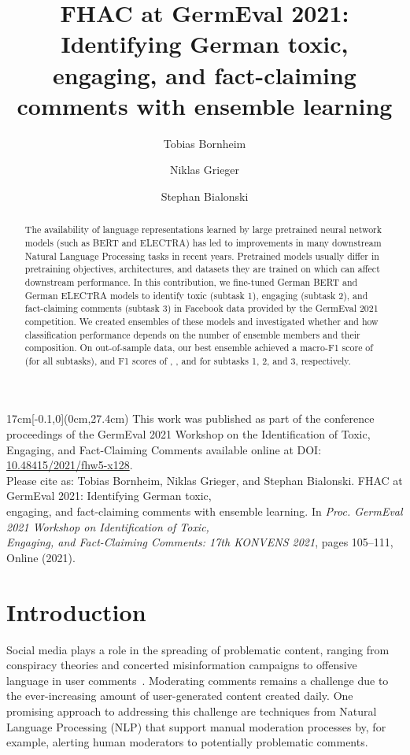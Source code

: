 \documentclass[11pt,a4paper]{article}
\title{FHAC at GermEval 2021: Identifying German toxic, engaging, and fact-claiming comments with ensemble learning}
\author[1]{Tobias Bornheim}
\author[1]{Niklas Grieger}
\author[1,2,*]{Stephan Bialonski}
\affil[1]{Department of Medical Engineering and Technomathematics\authorcr
FH Aachen University of Applied Sciences, Jülich, Germany\authorcr}
\affil[2]{Institute for Data-Driven Technologies\authorcr
FH Aachen University of Applied Sciences, Jülich, Germany}
\affil[*]{\textit{bialonski@fh-aachen.de}}
\date{}
\begin{document}
\maketitle
\begin{abstract}
The availability of language representations learned by large pretrained neural network models (such as BERT and ELECTRA) has led to improvements in many downstream Natural Language Processing tasks in recent years. Pretrained models usually differ in pretraining objectives, architectures, and datasets they are trained on which can affect downstream performance.
In this contribution, we fine-tuned German BERT and German \mbox{ELECTRA} models to identify toxic (subtask 1), engaging (subtask 2), and \mbox{fact-claiming} comments (subtask 3) in Facebook data provided by the GermEval 2021 competition. We created ensembles of these models and investigated whether and how classification performance depends on the number of ensemble members and their composition.
On \mbox{out-of-sample} data, our best ensemble achieved a macro-F1 score of  (for all subtasks), and F1 scores of , , and  for subtasks 1, 2, and 3, respectively.
\end{abstract}


\begin{textblock*}{17cm}[-0.1,0](0cm,27.4cm)
    \centering
    \small
    This work was published as part of the conference proceedings of the GermEval 2021 Workshop on the Identification of Toxic, \\Engaging, and Fact-Claiming Comments available online at DOI: \href{https://dx.doi.org/10.48415/2021/fhw5-x128}{10.48415/2021/fhw5-x128}. \\
    Please cite as: Tobias Bornheim, Niklas Grieger, and Stephan Bialonski. FHAC at GermEval 2021: Identifying German toxic, \\engaging, and fact-claiming comments with ensemble learning. In \textit{Proc. GermEval 2021 Workshop on Identification of Toxic, \\Engaging, and Fact-Claiming Comments: 17th KONVENS 2021}, pages 105--111, Online (2021).
\end{textblock*}


\section{Introduction}
Social media plays a role in the spreading of problematic content, ranging from conspiracy theories and concerted misinformation campaigns to offensive language in user comments~\citep{Zhuravskaya2020}. Moderating comments remains a challenge due to the ever-increasing amount of user-generated content created daily. One promising approach to addressing this challenge are techniques from Natural Language Processing (NLP) that support manual moderation processes by, for example, alerting human moderators to potentially problematic comments.
\end{document}
